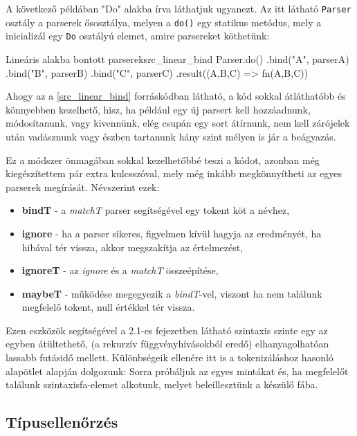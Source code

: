 A következő példában "Do" alakba írva láthatjuk ugyanezt. Az itt látható \texttt{Parser} osztály a parserek ősosztálya, melyen a \texttt{do()} egy statikus metódus, mely a inicializál egy \texttt{Do} osztályú elemet, amire parsereket köthetünk:

\begin{code}{Lineáris alakba bontott parserek}{src_linear_bind}
Parser.do()
    .bind("A", parserA)
    .bind("B", parserB)
    .bind("C", parserC)
    .result(({A,B,C}) => fn(A,B,C))
\end{code}

Ahogy az a \ref{src_linear_bind} forráskódban látható, a kód sokkal átláthatóbb és könnyebben kezelhető, hisz, ha például egy új parsert kell hozzáadnunk, módosítanunk, vagy kivennünk, elég csupán egy sort átírnunk, nem kell zárójelek után vadásznunk vagy észben tartanunk hány szint mélyen is jár a beágyazás. 

Ez a módszer önmagában sokkal kezelhetőbbé teszi a kódot, azonban még kiegészítettem pár extra kulcsszóval, mely még inkább megkönnyítheti az egyes parserek megírását. Névszerint ezek:

\begin{itemize}
    \item \textbf{bindT} - a \textit{matchT} parser segítségével egy tokent köt a névhez,
    \item \textbf{ignore} - ha a parser sikeres, figyelmen kívül hagyja az eredményét, ha hibával tér vissza, akkor megszakítja az értelmezést,
    \item \textbf{ignoreT} - az \textit{ignore} és a \textit{matchT} összeépítése,
    \item \textbf{maybeT} - működése megegyezik a \textit{bindT}-vel, viszont ha nem találunk megfelelő tokent, null értékkel tér vissza.
\end{itemize}

Ezen eszközök segítségével a 2.1-es fejezetben látható szintaxis szinte egy az egyben átültethető, (a rekurzív függvényhívásokból eredő) elhanyagolhatóan lassabb futásidő mellett. Különbségeik ellenére itt is a  tokenizáláshoz hasonló alapötlet alapján dolgozunk: Sorra próbáljuk az egyes mintákat és, ha megfelelőt találunk szintaxisfa-elemet alkotunk, melyet beleillesztünk a készülő fába.

\subsection{Típusellenőrzés}
\label{sec:typecheck}

